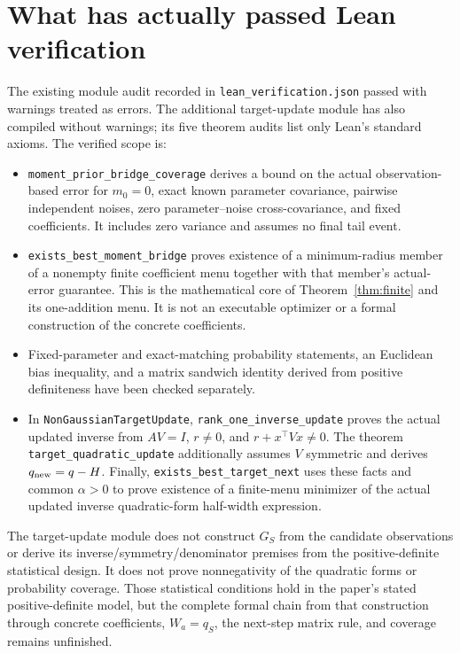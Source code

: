 \documentclass[11pt]{article}
\theoremstyle{remark}
\begin{document}
\section{What has actually passed Lean verification}
The existing module audit recorded in \texttt{lean\_verification.json} passed with warnings treated as errors. The additional target-update module has also compiled without warnings; its five theorem audits list only Lean's standard axioms. The verified scope is:
\begin{itemize}
 \item \texttt{moment\_prior\_bridge\_coverage} derives a bound on the actual observation-based error for $m_0=0$, exact known parameter covariance, pairwise independent noises, zero parameter--noise cross-covariance, and fixed coefficients. It includes zero variance and assumes no final tail event.
 \item \texttt{exists\_best\_moment\_bridge} proves existence of a minimum-radius member of a nonempty finite coefficient menu together with that member's actual-error guarantee. This is the mathematical core of Theorem~\ref{thm:finite} and its one-addition menu. It is not an executable optimizer or a formal construction of the concrete coefficients.
 \item Fixed-parameter and exact-matching probability statements, an Euclidean bias inequality, and a matrix sandwich identity derived from positive definiteness have been checked separately.
 \item In \texttt{NonGaussianTargetUpdate}, \texttt{rank\_one\_inverse\_update} proves the actual updated inverse from $AV=I$, $r\ne0$, and $r+x^\top Vx\ne0$. The theorem \texttt{target\_quadratic\_update} additionally assumes $V$ symmetric and derives $q_{\rm new}=q-H$. Finally, \texttt{exists\_best\_target\_next} uses these facts and common $\alpha>0$ to prove existence of a finite-menu minimizer of the actual updated inverse quadratic-form half-width expression.
\end{itemize}
The target-update module does not construct $G_S$ from the candidate observations or derive its inverse/symmetry/denominator premises from the positive-definite statistical design. It does not prove nonnegativity of the quadratic forms or probability coverage. Those statistical conditions hold in the paper's stated positive-definite model, but the complete formal chain from that construction through concrete coefficients, $W_a=q_S$, the next-step matrix rule, and coverage remains unfinished.
\end{document}
